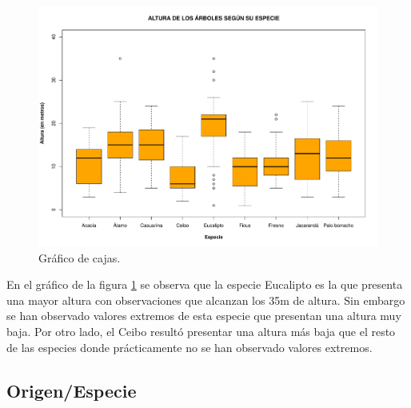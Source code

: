 \documentclass[11pt]{article}
\begin{document}
\begin{figure}[h!]
  \begin{center}
    \includegraphics[width=0.9\linewidth]{boxAlturaEspecie.pdf}
    \caption{Gráfico de cajas.}
    \label{fig:boxAlturaEspecie}
  \end{center}  
\end{figure}

\begin{justify}
  En el gráfico de la figura \ref{fig:boxAlturaEspecie} se observa
  que la especie Eucalipto es la que presenta una mayor altura con observaciones
  que alcanzan los 35m de altura. Sin embargo se han observado valores extremos
  de esta especie que presentan una altura muy baja. Por otro lado, el Ceibo resultó
  presentar una altura más baja que el resto de las especies donde prácticamente
  no se han observado valores extremos.
\end{justify}


\subsection{Origen/Especie}
\end{document}
